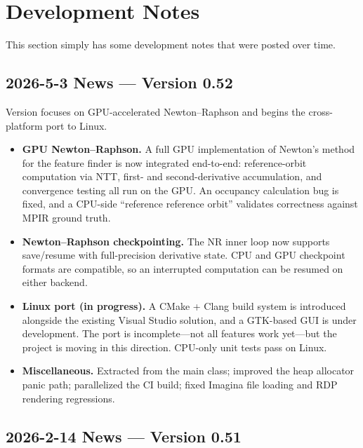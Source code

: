 \section{Development Notes}

This section simply has some development notes that were posted over time.

\subsection{2026-5-3 News --- Version 0.52}

Version  focuses on GPU-accelerated Newton--Raphson and begins the
cross-platform port to Linux.

\begin{itemize}
\item \textbf{GPU Newton--Raphson.}  A full GPU implementation of Newton's method
  for the feature finder is now integrated end-to-end: reference-orbit
  computation via NTT, first- and second-derivative accumulation, and
  convergence testing all run on the GPU.  An occupancy calculation bug is
  fixed, and a CPU-side ``reference reference orbit'' validates correctness
  against MPIR ground truth.

\item \textbf{Newton--Raphson checkpointing.}  The NR inner loop now supports
  save/resume with full-precision derivative state.  CPU and GPU checkpoint
  formats are compatible, so an interrupted computation can be resumed on
  either backend.

\item \textbf{Linux port (in progress).}  A CMake + Clang build system is
  introduced alongside the existing Visual Studio solution, and a GTK-based
  GUI is under development.  The port is incomplete---not all features work
  yet---but the project is moving in this direction.  CPU-only unit tests
  pass on Linux.

\item \textbf{Miscellaneous.}  Extracted  from
  the main class; improved the heap allocator panic path; parallelized the
  CI build; fixed Imagina file loading and RDP rendering regressions.
\end{itemize}

\subsection{2026-2-14 News --- Version 0.51}

